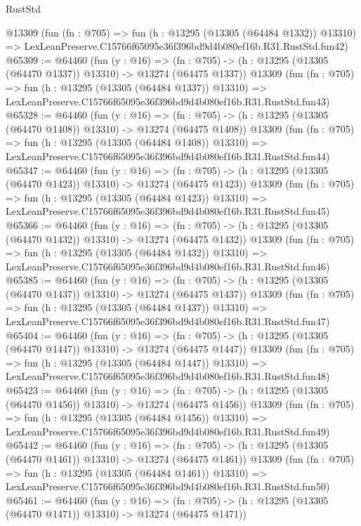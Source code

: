 \begin{lexlean}{RustStd}
\begin{coremodule}
    @13309
    (fun (fn : @705) =>
    fun (h : @13295 (@13305 (@64484 @1332)) @13310) =>
    LexLeanPreserve.C15766f65095e36f396bd9d4b080ef16b.R31.RustStd.fun42)
@65309 := @64460
    (fun (y : @16) =>
    (fn : @705) -> (h : @13295 (@13305 (@64470 @1337)) @13310) -> @13274 (@64475 @1337))
    @13309
    (fun (fn : @705) =>
    fun (h : @13295 (@13305 (@64484 @1337)) @13310) =>
    LexLeanPreserve.C15766f65095e36f396bd9d4b080ef16b.R31.RustStd.fun43)
@65328 := @64460
    (fun (y : @16) =>
    (fn : @705) -> (h : @13295 (@13305 (@64470 @1408)) @13310) -> @13274 (@64475 @1408))
    @13309
    (fun (fn : @705) =>
    fun (h : @13295 (@13305 (@64484 @1408)) @13310) =>
    LexLeanPreserve.C15766f65095e36f396bd9d4b080ef16b.R31.RustStd.fun44)
@65347 := @64460
    (fun (y : @16) =>
    (fn : @705) -> (h : @13295 (@13305 (@64470 @1423)) @13310) -> @13274 (@64475 @1423))
    @13309
    (fun (fn : @705) =>
    fun (h : @13295 (@13305 (@64484 @1423)) @13310) =>
    LexLeanPreserve.C15766f65095e36f396bd9d4b080ef16b.R31.RustStd.fun45)
@65366 := @64460
    (fun (y : @16) =>
    (fn : @705) -> (h : @13295 (@13305 (@64470 @1432)) @13310) -> @13274 (@64475 @1432))
    @13309
    (fun (fn : @705) =>
    fun (h : @13295 (@13305 (@64484 @1432)) @13310) =>
    LexLeanPreserve.C15766f65095e36f396bd9d4b080ef16b.R31.RustStd.fun46)
@65385 := @64460
    (fun (y : @16) =>
    (fn : @705) -> (h : @13295 (@13305 (@64470 @1437)) @13310) -> @13274 (@64475 @1437))
    @13309
    (fun (fn : @705) =>
    fun (h : @13295 (@13305 (@64484 @1437)) @13310) =>
    LexLeanPreserve.C15766f65095e36f396bd9d4b080ef16b.R31.RustStd.fun47)
@65404 := @64460
    (fun (y : @16) =>
    (fn : @705) -> (h : @13295 (@13305 (@64470 @1447)) @13310) -> @13274 (@64475 @1447))
    @13309
    (fun (fn : @705) =>
    fun (h : @13295 (@13305 (@64484 @1447)) @13310) =>
    LexLeanPreserve.C15766f65095e36f396bd9d4b080ef16b.R31.RustStd.fun48)
@65423 := @64460
    (fun (y : @16) =>
    (fn : @705) -> (h : @13295 (@13305 (@64470 @1456)) @13310) -> @13274 (@64475 @1456))
    @13309
    (fun (fn : @705) =>
    fun (h : @13295 (@13305 (@64484 @1456)) @13310) =>
    LexLeanPreserve.C15766f65095e36f396bd9d4b080ef16b.R31.RustStd.fun49)
@65442 := @64460
    (fun (y : @16) =>
    (fn : @705) -> (h : @13295 (@13305 (@64470 @1461)) @13310) -> @13274 (@64475 @1461))
    @13309
    (fun (fn : @705) =>
    fun (h : @13295 (@13305 (@64484 @1461)) @13310) =>
    LexLeanPreserve.C15766f65095e36f396bd9d4b080ef16b.R31.RustStd.fun50)
@65461 := @64460
    (fun (y : @16) =>
    (fn : @705) -> (h : @13295 (@13305 (@64470 @1471)) @13310) -> @13274 (@64475 @1471))

\end{coremodule}
\end{lexlean}
